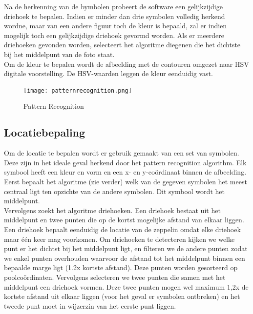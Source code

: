 \documentclass[eind]{penoverslag}
\begin{document}
Na de herkenning van de bymbolen probeert de software een gelijkzijdige driehoek te bepalen. Indien er minder dan drie symbolen volledig herkend wordne, maar van een andere figuur toch de kleur is bepaald, zal er indien mogelijk toch een gelijkzijdige driehoek gevormd worden. Als er meerdere driehoeken gevonden worden, selecteert het algoritme diegenen die het dichtste bij het middelpunt van de foto staat.\\

Om de kleur te bepalen wordt de afbeelding met de contouren omgezet naar HSV digitale voorstelling. De HSV-waarden leggen de kleur eenduidig vast.\\


\begin{figure}[H]
\begin{center}
\texttt{[image: patternrecognition.png]}
\end{center}
\caption{Pattern Recognition}
\label{Patterns}
\end{figure}

\subsection{Locatiebepaling}
Om de locatie te bepalen wordt er gebruik gemaakt van een set van symbolen. Deze zijn in het ideale geval herkend door het pattern recognition algorithm. Elk symbool heeft een kleur en vorm en een x- en y-coördinaat binnen de afbeelding. Eerst bepaalt het algoritme (zie verder) welk van de gegeven symbolen het meest centraal ligt ten opzichte van de andere symbolen. Dit symbool wordt het middelpunt.\\

Vervolgens zoekt het algoritme driehoeken. Een driehoek bestaat uit het middelpunt en twee punten die op de kortst mogelijke afstand van elkaar liggen. Een driehoek bepaalt eenduidig de locatie van de zeppelin omdat elke driehoek maar \'e\'en keer mag voorkomen. Om driehoeken te detecteren kijken we welke punt er het dichtst bij het middelpunt ligt, en filteren we de andere punten zodat we enkel punten overhouden waarvoor de afstand tot het middelpunt binnen een bepaalde marge ligt (1.2x kortste afstand). Deze punten worden gesorteerd op poolcoördinaten. Vervolgens selecteren we twee punten die samen met het middelpunt een driehoek vormen. Deze twee punten mogen wel maximum 1,2x de kortste afstand uit elkaar liggen (voor het geval er symbolen ontbreken) en het tweede punt moet in wijzerzin van het eerste punt liggen.\\
\end{document}
